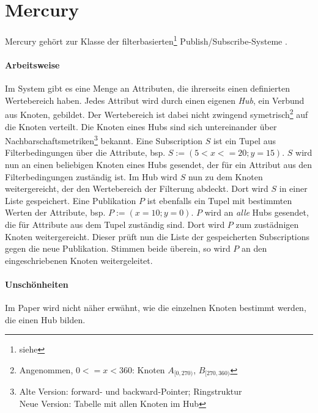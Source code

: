 \section*{Mercury}
\label{chap:related:mercury}
Mercury \cite{Bharambe2004Mercury} gehört zur Klasse der filterbasierten\footnote{siehe } Publish/Subscribe-Systeme .

\paragraph{Arbeitsweise}
Im System gibt es eine Menge an Attributen, die ihrerseits einen definierten Wertebereich haben. Jedes Attribut wird durch einen eigenen \emph{Hub}, ein Verbund aus Knoten, gebildet. Der Wertebereich ist dabei nicht zwingend symetrisch\footnote{Angenommen, $0<=x<360$: Knoten $A_{[0,270)}$, $B_{[270, 360)}$} auf die Knoten verteilt. Die Knoten eines Hubs sind sich untereinander über Nachbarschaftsmetriken\footnote{Alte Version: forward- und backward-Pointer; Ringstruktur\\Neue Version: Tabelle mit allen Knoten im Hub} bekannt.
Eine Subscription $S$ ist ein Tupel aus Filterbedingungen über die Attribute, bsp. $S := (5 < x <= 20; y = 15)$. $S$ wird nun an einen beliebigen Knoten eines Hubs gesendet, der für ein Attribut aus den Filterbedingungen zuständig ist. Im Hub wird $S$ nun zu dem Knoten weitergereicht, der den Wertebereich der Filterung abdeckt. Dort wird $S$ in einer Liste gespeichert.
Eine Publikation $P$ ist ebenfalls ein Tupel mit bestimmten Werten der Attribute, bsp. $P := (x = 10; y = 0)$. $P$ wird an \emph{alle} Hubs gesendet, die für Attribute aus dem Tupel zuständig sind. Dort wird $P$ zum zustädnigen Knoten weitergereicht. Dieser prüft nun die Liste der gespeicherten Subscriptions gegen die neue Publikation. Stimmen beide überein, so wird $P$ an den eingeschriebenen Knoten weitergeleitet.

\paragraph{Unschönheiten}
Im Paper wird nicht näher erwähnt, wie die einzelnen Knoten bestimmt werden, die einen Hub bilden.
